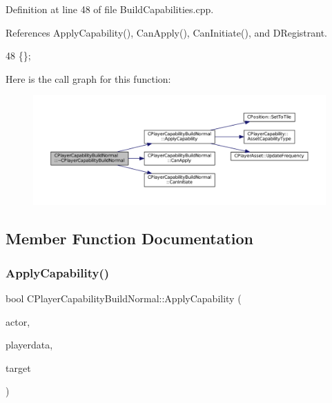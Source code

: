 Definition at line 48 of file Build\+Capabilities.\+cpp.



References Apply\+Capability(), Can\+Apply(), Can\+Initiate(), and D\+Registrant.


\begin{DoxyCode}
48 \{\};
\end{DoxyCode}
Here is the call graph for this function\+:\nopagebreak
\begin{figure}[H]
\begin{center}
\leavevmode
\includegraphics[width=350pt]{classCPlayerCapabilityBuildNormal_aed39be621a98ed6d1aaf470cd5bf1ff5_cgraph}
\end{center}
\end{figure}


\subsection{Member Function Documentation}
\hypertarget{classCPlayerCapabilityBuildNormal_afc2fbda17580385a4028d44cd03c9149}{}\label{classCPlayerCapabilityBuildNormal_afc2fbda17580385a4028d44cd03c9149} 
\subsubsection{\texorpdfstring{Apply\+Capability()}{ApplyCapability()}}
{\footnotesize\ttfamily bool C\+Player\+Capability\+Build\+Normal\+::\+Apply\+Capability (\begin{DoxyParamCaption}\item[{std\+::shared\+\_\+ptr$<$ \hyperlink{classCPlayerAsset}{C\+Player\+Asset} $>$}]{actor,  }\item[{std\+::shared\+\_\+ptr$<$ \hyperlink{classCPlayerData}{C\+Player\+Data} $>$}]{playerdata,  }\item[{std\+::shared\+\_\+ptr$<$ \hyperlink{classCPlayerAsset}{C\+Player\+Asset} $>$}]{target }\end{DoxyParamCaption})\hspace{0.3cm}{\ttfamily [virtual]}}



